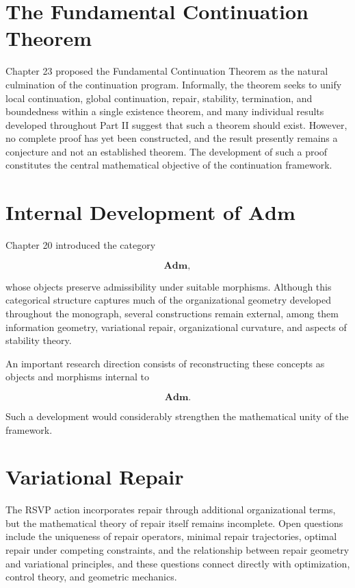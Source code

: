 \documentclass[11pt,oneside]{book}
\numberwithin{equation}{chapter}
\theoremstyle{definition}
\theoremstyle{plain}
\begin{document}
\section{The Fundamental Continuation Theorem}

Chapter 23 proposed the Fundamental Continuation Theorem as the natural culmination of the continuation program. Informally, the theorem seeks to unify local continuation, global continuation, repair, stability, termination, and boundedness within a single existence theorem, and many individual results developed throughout Part II suggest that such a theorem should exist. However, no complete proof has yet been constructed, and the result presently remains a conjecture and not an established theorem. The development of such a proof constitutes the central mathematical objective of the continuation framework.

\section{Internal Development of \texorpdfstring{$\mathbf{Adm}$}{Adm}}

Chapter 20 introduced the category

\[
\mathbf{Adm},
\]

whose objects preserve admissibility under suitable morphisms. Although this categorical structure captures much of the organizational geometry developed throughout the monograph, several constructions remain external, among them information geometry, variational repair, organizational curvature, and aspects of stability theory.

An important research direction consists of reconstructing these concepts
as objects and morphisms internal to

\[
\mathbf{Adm}.
\]

Such a development would considerably strengthen the mathematical unity of
the framework.

\section{Variational Repair}

The RSVP action incorporates repair through additional organizational terms, but the mathematical theory of repair itself remains incomplete. Open questions include the uniqueness of repair operators, minimal repair trajectories, optimal repair under competing constraints, and the relationship between repair geometry and variational principles, and these questions connect directly with optimization, control theory, and geometric mechanics.
\end{document}
